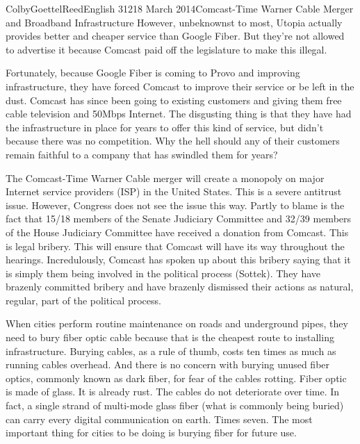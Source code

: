 \documentclass[12pt]{article}
\begin{document}
\begin{mla}{Colby}{Goettel}{Reed}{English 312}{18 March 2014}{Comcast-Time Warner Cable Merger and Broadband Infrastructure}
However, unbeknownst to most, Utopia actually provides better and cheaper service than Google Fiber. But they're not allowed to advertise it because Comcast paid off the legislature to make this illegal.

Fortunately, because Google Fiber is coming to Provo and improving infrastructure, they have forced Comcast to improve their service or be left in the dust. Comcast has since been going to existing customers and giving them free cable television and 50Mbps Internet. The disgusting thing is that they have had the infrastructure in place for years to offer this kind of service, but didn't because there was no competition. Why the hell should any of their customers remain faithful to a company that has swindled them for years?

The Comcast-Time Warner Cable merger will create a monopoly on major Internet service providers (ISP) in the United States. This is a severe antitrust issue. However, Congress does not see the issue this way. Partly to blame is the fact that 15/18 members of the Senate Judiciary Committee and 32/39 members of the House Judiciary Committee have received a donation from Comcast. This is legal bribery. This will ensure that Comcast will have its way throughout the hearings. Incredulously, Comcast has spoken up about this bribery saying that it is simply them being involved in the political process (Sottek). They have brazenly committed bribery and have brazenly dismissed their actions as natural, regular, part of the political process.


When cities perform routine maintenance on roads and underground pipes, they need to bury fiber optic cable because that is the cheapest route to installing infrastructure. Burying cables, as a rule of thumb, costs ten times as much as running cables overhead. And there is no concern with burying unused fiber optics, commonly known as dark fiber, for fear of the cables rotting. Fiber optic is made of glass. It is already rust. The cables do not deteriorate over time. In fact, a single strand of multi-mode glass fiber (what is commonly being buried) can carry every digital communication on earth. Times seven. The most important thing for cities to be doing is burying fiber for future use.


\end{mla}
\end{document}
